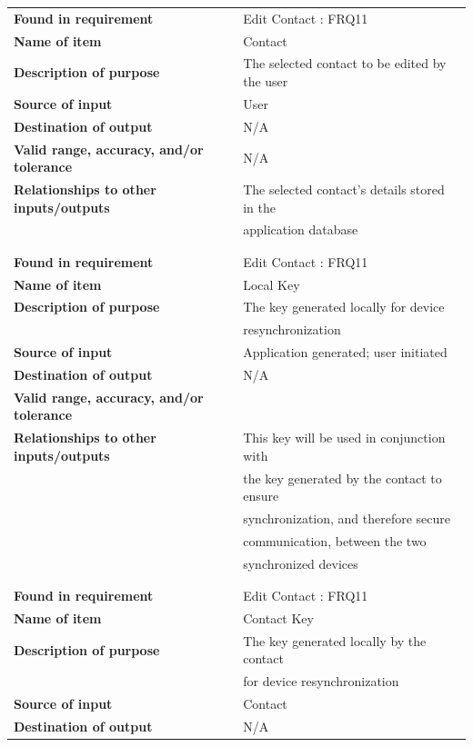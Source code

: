 \begin{tabular}{ll}
\textbf{Found in requirement}&Edit Contact : FRQ11\\
\textbf{Name of item}&Contact\\
\textbf{Description of purpose}&The selected contact to be edited by the user\\
\textbf{Source of input}&User\\
\textbf{Destination of output}&N/A\\
\textbf{Valid range, accuracy, and/or tolerance}&N/A\\
\textbf{Relationships to other inputs/outputs}&The selected contact's details stored in the\\& application database\\
&\\
&\\
\textbf{Found in requirement}&Edit Contact : FRQ11\\
\textbf{Name of item}&Local Key\\
\textbf{Description of purpose}&The key generated locally for device\\& resynchronization\\
\textbf{Source of input}&Application generated; user initiated\\
\textbf{Destination of output}&N/A\\
\textbf{Valid range, accuracy, and/or tolerance}&\\
\textbf{Relationships to other inputs/outputs}&This key will be used in conjunction with\\& the key generated by the contact to ensure\\& synchronization, and therefore secure\\& communication, between the two \\&synchronized devices\\
&\\
&\\
\textbf{Found in requirement}&Edit Contact : FRQ11\\
\textbf{Name of item}&Contact Key\\
\textbf{Description of purpose}&The key generated locally by the contact\\& for device resynchronization\\
\textbf{Source of input}&Contact\\
\textbf{Destination of output}&N/A\\

\end{tabular}
